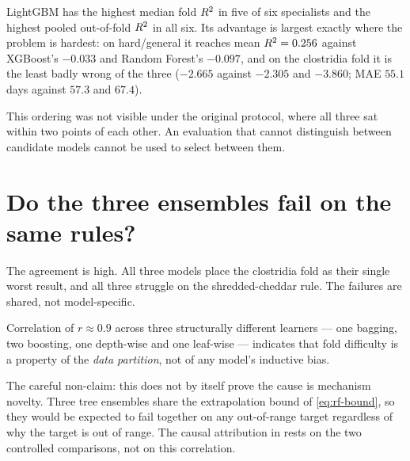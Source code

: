 

\begin{findingbox}[title=LightGBM is the strongest model under the revised protocol]
LightGBM has the highest median fold $R^2$ in five of six specialists and
the highest pooled out-of-fold $R^2$ in all six. Its advantage is largest
exactly where the problem is hardest: on hard/general it reaches mean
$R^2 = 0.256$ against XGBoost's $-0.033$ and Random Forest's $-0.097$,
and on the clostridia fold it is the least badly wrong of the three
($-2.665$ against $-2.305$ and $-3.860$; MAE $55.1$ days against $57.3$
and $67.4$).

This ordering was not visible under the original protocol, where all three
sat within two points of each other. An evaluation that cannot distinguish
between candidate models cannot be used to select between them.
\end{findingbox}

\section{Do the three ensembles fail on the same rules?}


The agreement is high. All three models place the clostridia fold as their
single worst result, and all three struggle on the shredded-cheddar rule.
The failures are shared, not model-specific.

\begin{findingbox}[title=What correlated failure does and does not imply]
Correlation of $r \approx 0.9$ across three structurally different
learners --- one bagging, two boosting, one depth-wise and one leaf-wise
--- indicates that fold difficulty is a property of the \emph{data
partition}, not of any model's inductive bias.

The careful non-claim: this does not by itself prove the cause is
mechanism novelty. Three tree ensembles share the extrapolation bound of
\cref{eq:rf-bound}, so they would be expected to fail together on any
out-of-range target regardless of why the target is out of range. The
causal attribution in  rests on the two
controlled comparisons, not on this correlation.
\end{findingbox}


